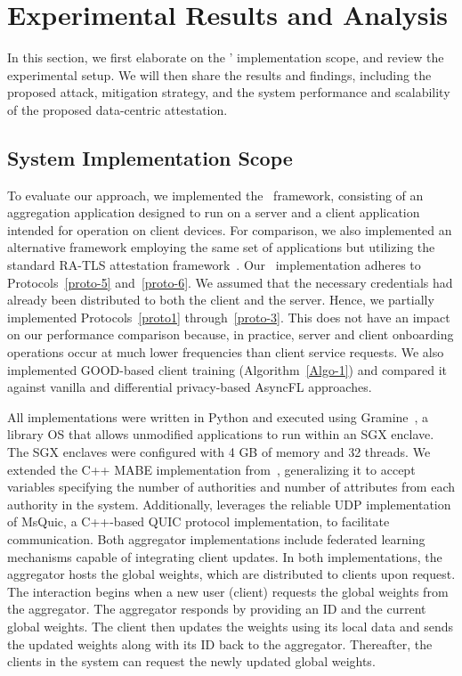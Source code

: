 \section{Experimental Results and Analysis}
\label{sec08} 
In this section, we first elaborate on the \sysname' implementation scope, and review the experimental setup. We will then share the results and findings, including the proposed attack, mitigation strategy, and the system performance and scalability of the proposed data-centric attestation.



\subsection{System Implementation Scope}
\label{implementation}
To evaluate our approach, we implemented the \sysname~framework, consisting of an aggregation application designed to run on a server and a client application intended for operation on client devices. For comparison, we also implemented an alternative framework employing the same set of applications but utilizing the standard RA-TLS attestation framework~\cite{intel2018ratls}.
Our \sysname~implementation adheres to Protocols~\ref{proto-5} and~\ref{proto-6}. We assumed that the necessary credentials had already been distributed to both the client and the server. Hence, we partially implemented Protocols~\ref{proto1} through~\ref{proto-3}. This does not have an impact on our performance comparison because, in practice, server and client onboarding operations occur at much lower frequencies than client service requests. We also implemented GOOD-based client training (Algorithm~\ref{Algo-1}) and compared it against vanilla and differential privacy-based AsyncFL approaches.

All implementations were written in Python and executed using Gramine~\cite{gramine}, a library OS that allows unmodified applications to run within an SGX enclave. The SGX enclaves were configured with 4 GB of memory and 32 threads. We extended the C++ MABE implementation from~\cite{edgeCom}, generalizing it to accept variables specifying the number of authorities and number of attributes from each authority in the system. Additionally, \sysname leverages the reliable UDP implementation of MsQuic, a C++-based QUIC protocol implementation, to facilitate communication. Both aggregator implementations include federated learning mechanisms capable of integrating client updates.
In both implementations, the aggregator hosts the global weights, which are distributed to clients upon request. The interaction begins when a new user (client) requests the global weights from the aggregator. The aggregator responds by providing an ID and the current global weights. The client then updates the weights using its local data and sends the updated weights along with its ID back to the aggregator. Thereafter, the clients in the system can request the newly updated global weights.


